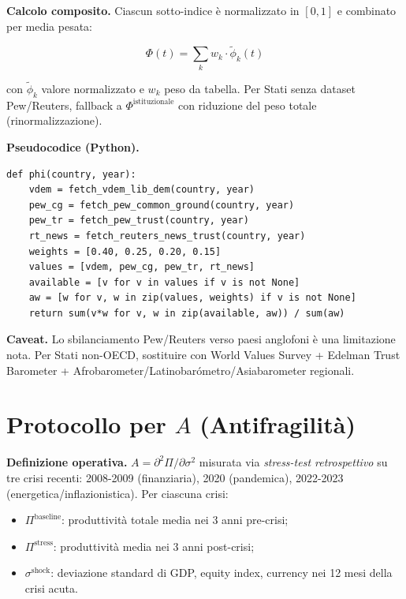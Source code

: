 \Proved{} \textbf{Calcolo composito.} Ciascun sotto-indice è
normalizzato in \([0, 1]\) e combinato per media pesata:

\[
\Phi(t) = \sum_k w_k \cdot \tilde{\phi}_k(t)
\]

con \(\tilde{\phi}_k\) valore normalizzato e \(w_k\) peso da tabella.
Per Stati senza dataset Pew/Reuters, fallback a
\(\Phi^{\text{istituzionale}}\) con riduzione del peso totale
(rinormalizzazione).

\Hypoth{} \textbf{Pseudocodice (Python).}

\begin{verbatim}
def phi(country, year):
    vdem = fetch_vdem_lib_dem(country, year)
    pew_cg = fetch_pew_common_ground(country, year)
    pew_tr = fetch_pew_trust(country, year)
    rt_news = fetch_reuters_news_trust(country, year)
    weights = [0.40, 0.25, 0.20, 0.15]
    values = [vdem, pew_cg, pew_tr, rt_news]
    available = [v for v in values if v is not None]
    aw = [w for v, w in zip(values, weights) if v is not None]
    return sum(v*w for v, w in zip(available, aw)) / sum(aw)
\end{verbatim}

\Conj{} \textbf{Caveat.} Lo sbilanciamento Pew/Reuters verso paesi
anglofoni è una limitazione nota. Per Stati non-OECD, sostituire con
World Values Survey + Edelman Trust Barometer +
Afrobarometer/Latinobarómetro/Asiabarometer regionali.



\section{\texorpdfstring{Protocollo per \(A\)
(Antifragilità)}{Protocollo per A (Antifragilità)}}\label{protocollo-per-a-antifragilituxe0}

\Hypoth{} \textbf{Definizione operativa.}
\(A = \partial^2\Pi/\partial\sigma^2\) misurata via \emph{stress-test
retrospettivo} su tre crisi recenti: 2008-2009 (finanziaria), 2020
(pandemica), 2022-2023 (energetica/inflazionistica). Per ciascuna crisi:

\begin{itemize}
\tightlist
\item
  \(\Pi^{\text{baseline}}\): produttività totale media nei 3 anni
  pre-crisi;
\item
  \(\Pi^{\text{stress}}\): produttività media nei 3 anni post-crisi;
\item
  \(\sigma^{\text{shock}}\): deviazione standard di GDP, equity index,
  currency nei 12 mesi della crisi acuta.
\end{itemize}

